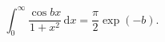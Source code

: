 %

\begin{problem}[pytanie 9402]
    \label{stack_9402}%
    \begin{equation}
        \int_0^\infty \frac {\cos b x}{1+x^2} \,\mathrm{d}x = \frac{\pi} 2 \exp(-b).
    \end{equation}
\end{problem}

%